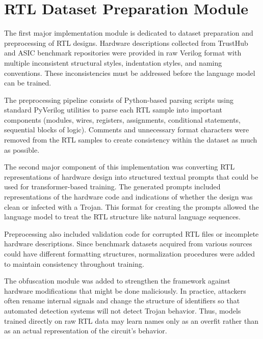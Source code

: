 \documentclass[12pt,a4paper]{report}
\begin{document}

\section{RTL Dataset Preparation Module}

The first major implementation module is dedicated to dataset preparation and preprocessing of RTL designs. Hardware descriptions collected from TrustHub and ASIC benchmark repositories were provided in raw Verilog format with multiple inconsistent structural styles, indentation styles, and naming conventions. These inconsistencies must be addressed before the language model can be trained.

The preprocessing pipeline consists of Python-based parsing scripts using standard PyVerilog utilities to parse each RTL sample into important components (modules, wires, registers, assignments, conditional statements, sequential blocks of logic). Comments and unnecessary format characters were removed from the RTL samples to create consistency within the dataset as much as possible.

The second major component of this implementation was converting RTL representations of hardware design into structured textual prompts that could be used for transformer-based training. The generated prompts included representations of the hardware code and indications of whether the design was clean or infected with a Trojan. This format for creating the prompts allowed the language model to treat the RTL structure like natural language sequences.

Preprocessing also included validation code for corrupted RTL files or incomplete hardware descriptions. Since benchmark datasets acquired from various sources could have different formatting structures, normalization procedures were added to maintain consistency throughout training.


The obfuscation module was added to strengthen the framework against hardware modifications that might be done maliciously. In practice, attackers often rename internal signals and change the structure of identifiers so that automated detection systems will not detect Trojan behavior. Thus, models trained directly on raw RTL data may learn names only as an overfit rather than as an actual representation of the circuit's behavior.
\end{document}
